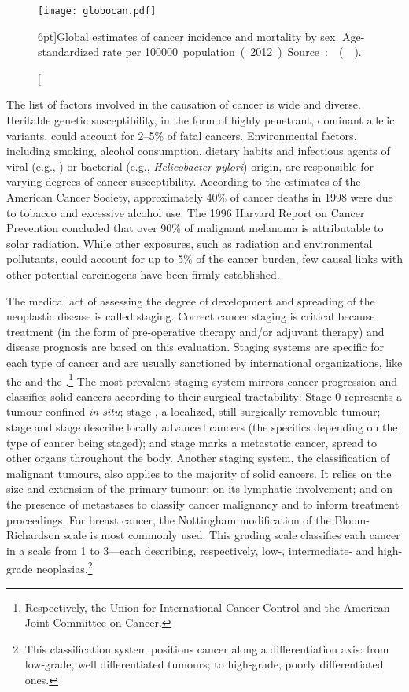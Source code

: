 \begin{figure}[ht]
  \texttt{[image: globocan.pdf]}
  \caption[Global estimates of cancer incidence and mortality by
  sex][6pt]{Global estimates of cancer incidence and mortality by sex.
    \mbox{Age-standardized} rate per \SI{100000} population (2012).  Source:
    \mbox{} (\citealp{ferlay_globocan_2014}).}
  \label{fig:globocan}
\end{figure}

The list of factors involved in the causation of cancer is wide and diverse.
Heritable genetic susceptibility, in the form of highly penetrant, dominant
allelic variants, could account for 2--5\% of fatal cancers.  Environmental
factors, including smoking, alcohol consumption, dietary habits and infectious
agents of viral (e.g., ) or bacterial (e.g., \emph{Helicobacter
  pylori}) origin, are responsible for varying degrees of cancer
susceptibility.\cite{cassidy_oxford_2010} According to the estimates of the
American Cancer Society, approximately 40\% of cancer deaths in 1998 were due to
tobacco and excessive alcohol use.  The 1996 Harvard Report on Cancer Prevention
concluded that over 90\% of malignant melanoma is attributable to solar
radiation.  While other exposures, such as radiation and environmental
pollutants, could account for up to 5\% of the cancer burden, few causal links
with other potential carcinogens have been firmly established.

The medical act of assessing the degree of development and spreading of the
neoplastic disease is called staging.  Correct cancer staging is critical
because treatment (in the form of pre-operative therapy and/or adjuvant therapy)
and disease prognosis are based on this evaluation.  Staging systems are
specific for each type of cancer and are usually sanctioned by international
organizations, like the  and the
.\footnote{Respectively, the Union for International Cancer
  Control and the American Joint Committee on Cancer.}  The most prevalent
staging system mirrors cancer progression and classifies solid cancers according
to their surgical tractability: Stage 0 represents a tumour confined \emph{in
  situ}; stage , a localized, still surgically removable tumour;
stage  and stage  describe locally advanced cancers
(the specifics depending on the type of cancer being staged); and stage
 marks a metastatic cancer, spread to other organs throughout the
body.\cite{greene_ajcc_2002} Another staging system, the 
classification of malignant tumours, also applies to the majority of solid
cancers. It relies on the size and extension of the primary tumour; on its
lymphatic involvement; and on the presence of metastases to classify cancer
malignancy and to inform treatment proceedings.\cite{denoix_enquete_1946} For
breast cancer, the Nottingham modification of the Bloom-Richardson scale is most
commonly used. This grading scale classifies each cancer in a scale from 1 to
3---each describing, respectively, low-, intermediate- and high-grade
neoplasias.\footnote{This classification system positions cancer along a
  differentiation axis: from low-grade, well differentiated tumours; to
  high-grade, poorly differentiated ones.}

